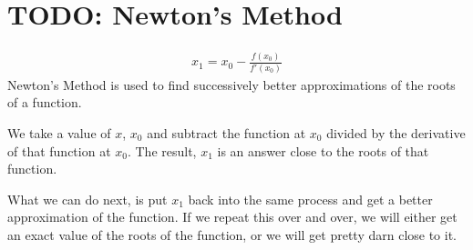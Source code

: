 \chapter{TODO: Newton's Method}
\label{chap:NewtonsMethod}
\begin{align}
  x_1 = x_0 - \frac{f(x_0)}{f'(x_0)}
\end{align}
Newton's Method is used to find successively better approximations of the roots
of a function.

We take a value of $x$, $x_0$ and subtract the function at $x_0$ divided by the
derivative of that function at $x_0$. The result, $x_1$ is an answer close to
the roots of that function.

What we can do next, is put $x_1$ back into the same process and get a better
approximation of the function. If we repeat this over and over, we will either
get an exact value of the roots of the function, or we will get pretty darn
close to it.
